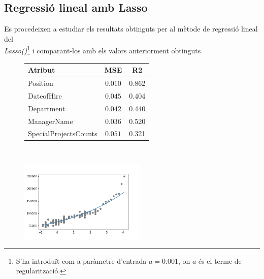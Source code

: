 \documentclass[a4paper, 11pt]{article}
\begin{document}
\subsection{Regressió lineal amb Lasso}\label{lineal_lasso}
Es procedeixen a estudiar els resultats obtinguts per al mètode de regressió lineal del \\ \textit{Lasso()}\footnote{S'ha introduït com a paràmetre d'entrada $a = 0.001$, on $a$ és el terme de regularització.} i comparant-los amb els valors anteriorment obtinguts.
\begin{figure}[h] %
\begin{minipage}{8cm} %
\begin{center}
    \begin{tabular}{l||c|c}
        \textbf{Atribut} & MSE & R2 \\ \hline \hline
        Position & $0.010$ & 0.862 \\\hline
        DateofHire & $0.045$ & 0.404 \\\hline
        Department & $0.042$ & 0.440 \\\hline
        ManagerName & $0.036$ & 0.520 \\\hline
        SpecialProjectsCounts & $0.051$ & 0.321 \\
    \end{tabular}\\
    \label{tab:afins}
\end{center}
\end{minipage} %
\hspace{2em}
\begin{minipage}{6.3cm} %
\begin{center}
   \begin{center}
    \includegraphics[width=6cm]{lasso/lasso_lineal_position.png}
    \label{regresor_lineal_simple}
    \end{center}
\end{center}
\end{minipage} %
\end{figure} %
\end{document}
